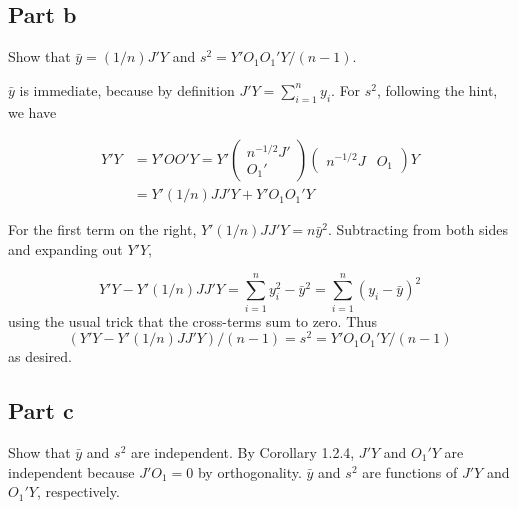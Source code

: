 \documentclass{article}
\begin{document}
\subsection*{Part b}

Show that $\bar{y} = (1/n)J'Y$ and $s^2 = Y'O_1O_1'Y/(n-1)$.

$\bar{y}$ is immediate, because by definition $J'Y = \sum_{i=1}^n y_i$. For $s^2$, following the hint, we have

\begin{align*}
Y'Y &= Y'OO'Y =
Y'\begin{pmatrix} n^{-1/2}J' \\ O_1'\end{pmatrix}
\begin{pmatrix} n^{-1/2}J & O_1\end{pmatrix}Y \\
&=Y'(1/n)JJ'Y + Y'O_1O_1'Y
\end{align*}

For the first term on the right, $Y'(1/n)JJ'Y = n\bar{y}^2$. Subtracting from both sides and expanding out $Y'Y$,

\[
Y'Y - Y'(1/n)JJ'Y = \sum_{i=1}^n y_i^2 - \bar{y}^2 = \sum_{i=1}^n(y_i-\bar{y})^2
\]
using the usual trick that the cross-terms sum to zero. Thus
\[
\left(Y'Y-Y'(1/n)JJ'Y\right)/(n-1) = s^2 = Y'O_1O_1'Y/(n-1)
\]
as desired.
\subsection*{Part c}
Show that $\bar{y}$ and $s^2$ are independent.
By Corollary 1.2.4, $J'Y$ and $O_1'Y$ are independent because $J'O_1=0$ by orthogonality. $\bar{y}$ and $s^2$ are functions of $J'Y$ and $O_1'Y$, respectively.
\end{document}
